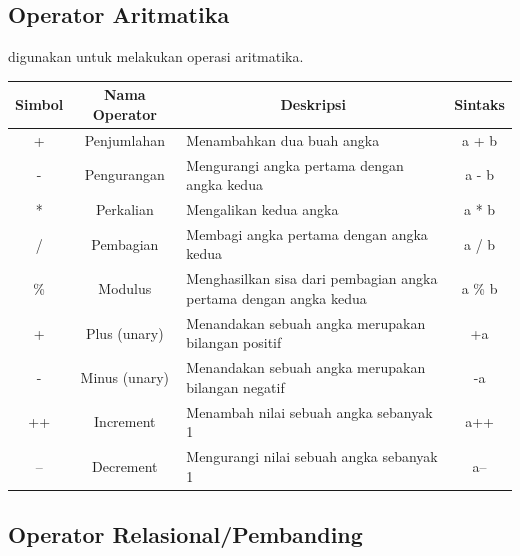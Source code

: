 \subsection{Operator Aritmatika}

digunakan untuk melakukan operasi aritmatika.
\begin{center}
	\begin{tabular}{|c|c|p{6cm}|c|}
		\hline
		\multicolumn{1}{|c|}{\textbf{Simbol}} &
		\multicolumn{1}{c|}{\textbf{Nama Operator}} &
		\multicolumn{1}{c|}{\textbf{Deskripsi}} &
		\multicolumn{1}{c|}{\textbf{Sintaks}} \\ \hline
		+   & Penjumlahan          & Menambahkan dua buah angka & a + b \\ \hline
		-   & Pengurangan          & Mengurangi angka pertama dengan angka kedua & a - b \\ \hline
		*   & Perkalian            & Mengalikan kedua angka & a * b \\ \hline
		/   & Pembagian            & Membagi angka pertama dengan angka kedua & a / b \\ \hline
		\%  & Modulus              & Menghasilkan sisa dari pembagian angka pertama dengan angka kedua & a \% b \\ \hline
		+   & Plus (unary)         & Menandakan sebuah angka merupakan bilangan positif & +a \\ \hline
		-   & Minus (unary)        & Menandakan sebuah angka merupakan bilangan negatif & -a \\ \hline
		++  & Increment            & Menambah nilai sebuah angka sebanyak 1 & a++ \\ \hline
		--  & Decrement            & Mengurangi nilai sebuah angka sebanyak 1 & a-- \\ \hline
	\end{tabular}
\end{center}


\subsection{Operator Relasional/Pembanding}

